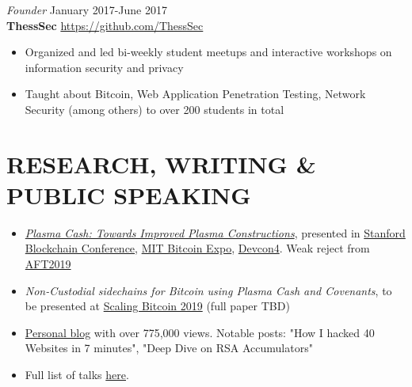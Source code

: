 \documentclass[margin, line]{res} %
\begin{document}
{\sl Founder} \hfill January 2017-June 2017 \\
\textbf{ThessSec} \hfill \url{https://github.com/ThessSec}
\begin{itemize} \itemsep -2pt %
    \item Organized and led bi-weekly student meetups and interactive workshops on information security and privacy
    \item Taught about Bitcoin, Web Application Penetration Testing, Network
    Security (among others) to over 200 students in total
\end{itemize}

\section{RESEARCH, WRITING \& PUBLIC SPEAKING}

\begin{itemize}
    \item \href{https://github.com/gakonst/plasma-cash-paper/raw/master/plasma_cash.pdf}{\textit{Plasma Cash: Towards Improved Plasma Constructions}}, presented in
    \href{https://youtu.be/9nD1elfVshc}{Stanford Blockchain Conference}, 
    \href{https://www.youtube.com/watch?v=ZQg_IckcvNI}{MIT Bitcoin Expo}, \href{https://www.youtube.com/watch?v=UKigyHGQQmQ}{Devcon4}.
    Weak reject from \href{https://aft.acm.org/}{AFT2019}
    \item \textit{Non-Custodial sidechains for Bitcoin using Plasma Cash and
    Covenants}, to be presented at \href{https://telaviv2019.scalingbitcoin.org/#schedule}{Scaling Bitcoin 2019} (full paper TBD)
    \item \href{https://medium.com/@gakonst}{Personal blog} with over 775,000
    views. Notable posts: "How I hacked 40 Websites in 7 minutes", "Deep Dive on
    RSA Accumulators"
    \item Full list of talks \href{https://www.gakonst.com/talks/}{here}.
\end{itemize}
\end{document}
